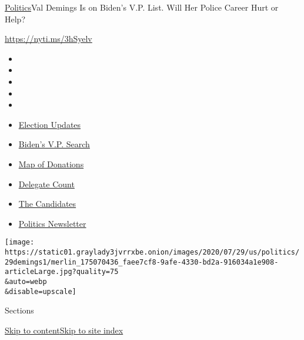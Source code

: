 \href{/section/politics}{Politics}\textbar{}Val Demings Is on Biden's
V.P. List. Will Her Police Career Hurt or Help?

\url{https://nyti.ms/3hSyelv}

\begin{itemize}
\item
\item
\item
\item
\item
\end{itemize}

\begin{itemize}
\item
  \href{https://www.nytimes3xbfgragh.onion/2020/08/03/us/elections/biden-vs-trump.html?action=click\&pgtype=Article\&state=default\&region=TOP_BANNER\&context=storylines_menu}{Election
  Updates}
\item
  \href{https://www.nytimes3xbfgragh.onion/article/biden-vice-president-2020.html?action=click\&pgtype=Article\&state=default\&region=TOP_BANNER\&context=storylines_menu}{Biden's
  V.P. Search}
\item
  \href{https://www.nytimes3xbfgragh.onion/interactive/2020/07/24/us/politics/trump-biden-campaign-donors.html?action=click\&pgtype=Article\&state=default\&region=TOP_BANNER\&context=storylines_menu}{Map
  of Donations}
\item
  \href{https://www.nytimes3xbfgragh.onion/interactive/2020/us/elections/delegate-count-primary-results.html?action=click\&pgtype=Article\&state=default\&region=TOP_BANNER\&context=storylines_menu}{Delegate
  Count}
\item
  \href{https://www.nytimes3xbfgragh.onion/interactive/2019/us/politics/2020-presidential-candidates.html?action=click\&pgtype=Article\&state=default\&region=TOP_BANNER\&context=storylines_menu}{The
  Candidates}
\item
  \href{https://www.nytimes3xbfgragh.onion/newsletters/politics?action=click\&pgtype=Article\&state=default\&region=TOP_BANNER\&context=storylines_menu}{Politics
  Newsletter}
\end{itemize}

\texttt{[image: https://static01.graylady3jvrrxbe.onion/images/2020/07/29/us/politics/29demings1/merlin\_175070436\_faee7cf8-9afe-4330-bd2a-916034a1e908-articleLarge.jpg?quality=75\\\&auto=webp\\\&disable=upscale]}

Sections

\protect\hyperlink{site-content}{Skip to
content}\protect\hyperlink{site-index}{Skip to site index}

